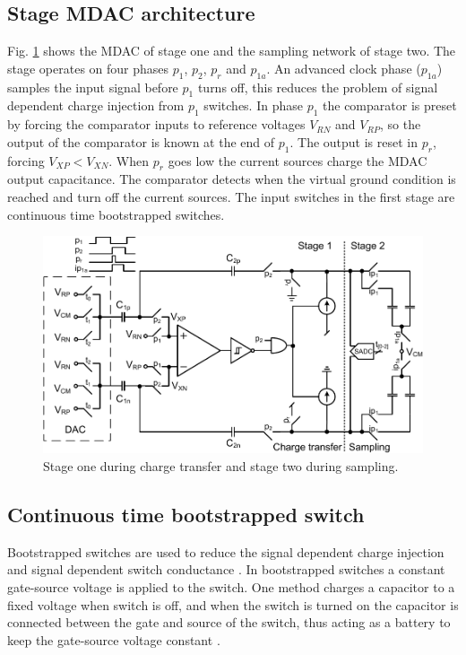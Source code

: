 \subsection{Stage MDAC architecture}
Fig. \ref{cbscfig:mdac} shows the MDAC of
stage one and the sampling network of stage two.  The stage operates on
four phases $p_1$, $p_2$, $p_r$ and $p_{1a}$. An advanced clock phase
($p_{1a}$) samples the input signal before $p_1$ turns
off, this reduces the problem of signal dependent
charge injection from $p_1$ switches. In phase $p_1$ the comparator is preset
by forcing the comparator inputs to reference voltages $V_{RN}$
and $V_{RP}$, so the output of the comparator is known at the
end of $p_1$. The output is reset in  $p_r$, forcing $V_{XP} <
V_{XN}$.  When $p_r$ goes low the current sources charge the MDAC
output capacitance. The comparator detects when the virtual ground
condition is reached and turn off the current sources. 
The input switches
in the first stage are continuous time bootstrapped switches.

\begin{figure}[htbp]
\centerline{ \includegraphics[width=\myfigwidthl]{graphics/mdac}}
  \caption{Stage one during charge transfer and stage two during sampling.}
  \label{cbscfig:mdac}
\end{figure}

\subsection{Continuous time bootstrapped switch}
Bootstrapped switches are used to reduce the signal dependent charge
injection and signal dependent 
switch conductance \cite{abo99}. In bootstrapped switches a constant
gate-source voltage is applied to the switch. One method  charges a
capacitor to a fixed voltage when switch is 
off, and when the switch is turned on the capacitor is connected
between the gate and source of the switch, thus acting as a battery to keep the gate-source voltage constant \cite{abo99}. 

